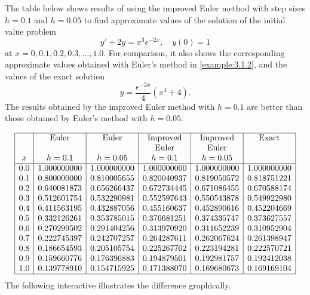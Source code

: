 \documentclass{ximera}
\begin{document}
\begin{example}\label{example:3.2.2}
The table below shows results of using the improved Euler method
with step sizes $h=0.1$ and $h=0.05$ to find approximate values of the
solution of the initial value problem
$$
y'+2y=x^3e^{-2x},\quad y(0)=1
$$
at $x=0, 0.1, 0.2, 0.3, \dots, 1.0$. For comparison, it also shows
the
corresponding approximate values obtained with Euler's method in
\ref{example:3.1.2}, and the values of the exact solution
$$
y=\frac{e^{-2x}}{4}(x^4+4).
$$
The results
obtained by the improved Euler method with $h=0.1$ are better than
those obtained by Euler's method with $h=0.05$.

$$
\begin{array}{|c|c|c|c|c|c|}
\hline
 &\text{Euler} &\text{Euler} &\text{Improved} &\text{Improved}& \text{Exact}\\
 & & &\text{Euler}&\text{Euler}& \\
x&h=0.1&h=0.05&h=0.1&h=0.05&
\\ \hline
0.0 & 1.000000000& 1.000000000& 1.000000000   &1.000000000 & 1.000000000 \\
0.1 & 0.800000000& 0.810005655& 0.820040937   &0.819050572 & 0.818751221 \\
0.2 & 0.640081873& 0.656266437& 0.672734445   &0.671086455 & 0.670588174 \\
0.3 & 0.512601754& 0.532290981& 0.552597643   &0.550543878 & 0.549922980 \\
0.4 & 0.411563195& 0.432887056& 0.455160637   &0.452890616 & 0.452204669 \\
0.5 & 0.332126261& 0.353785015& 0.376681251   &0.374335747 & 0.373627557 \\
0.6 & 0.270299502& 0.291404256& 0.313970920   &0.311652239 & 0.310952904 \\
0.7 & 0.222745397& 0.242707257& 0.264287611   &0.262067624 & 0.261398947 \\
0.8 & 0.186654593& 0.205105754& 0.225267702   &0.223194281 & 0.222570721 \\
0.9 & 0.159660776& 0.176396883& 0.194879501   &0.192981757 & 0.192412038 \\
1.0 & 0.139778910& 0.154715925& 0.171388070   &0.169680673 & 0.169169104\\
\hline
\end{array}
$$
The following interactive illustrates the difference graphically.

\begin{center}
\end{center}
\end{example}
\end{document}
